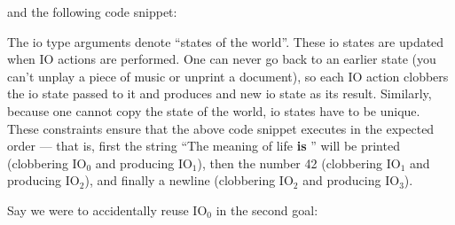 \documentclass[a4paper,11pt,notitlepage,onecolumn]{book}
\begin{document}
and the following code snippet:

\begin{small}

\begin{ptabular}
\nextline
{}
\nextline
{}
\nextline
\end{ptabular}

\end{small}

The \textsf{io} type arguments denote ``states of the world''.  These \textsf{io} states
are updated when IO actions are performed.  One can never go back to an
earlier state (you can't unplay a piece of music or unprint a document),
so each IO action clobbers the \textsf{io} state passed to it and produces
and new \textsf{io} state as its result.  Similarly, because one cannot copy the
state of the world, \textsf{io} states have to be unique.  These constraints ensure
that the above code snippet executes in the expected order --- that is,
first the string \textsf{``The meaning of life \textbf{is} ''} will be printed
(clobbering \textsf{IO$_{0}$} and producing \textsf{IO$_{1}$}), then the number \textsf{42}
(clobbering \textsf{IO$_{1}$} and producing \textsf{IO$_{2}$}), and finally a newline (clobbering
\textsf{IO$_{2}$} and producing \textsf{IO$_{3}$}).

Say we were to accidentally reuse \textsf{IO$_{0}$} in the second goal:

\begin{small}

\begin{ptabular}
\nextline
{}
\nextline
{}
\nextline
\end{ptabular}

\end{small}
\end{document}
